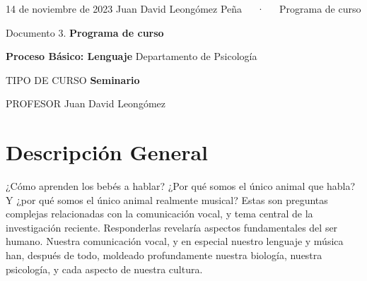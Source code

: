 \documentclass[11pt,a4paper,]{awesome-cv}
\begin{document}
\makecvheader

\makecvfooter
  {14 de noviembre de 2023}
    {Juan David Leongómez Peña~~~·~~~Programa de curso}
  {\thepage}





\vspace{4mm}
\begin{tcolorbox}[enhanced,
        on line, 
        boxsep=4pt, left=0pt,right=0pt,top=0pt,bottom=0pt,
        colframe=white,colback=black]
  
\color{white}
\begin{LARGE}\begin{center}
Documento 3. \textbf{Programa de curso}
\end{center}\end{LARGE}
\end{tcolorbox}

\begin{LARGE}\begin{center}
\textbf{Proceso Básico: Lenguaje}\linebreak
Departamento de Psicología
\end{center}\end{LARGE}

\begin{cvskills}
  \cvskill
    {TIPO DE CURSO}
    {\textbf{Seminario}}
    
  \cvskill
    {PROFESOR}
    {Juan David Leongómez}
\end{cvskills}

\hypertarget{descripciuxf3n-general}{%
\section{Descripción General}\label{descripciuxf3n-general}}

¿Cómo aprenden los bebés a hablar? ¿Por qué somos el único animal que
habla? Y ¿por qué somos el único animal realmente musical? Estas son
preguntas complejas relacionadas con la comunicación vocal, y tema
central de la investigación reciente. Responderlas revelaría aspectos
fundamentales del ser humano. Nuestra comunicación vocal, y en especial
nuestro lenguaje y música han, después de todo, moldeado profundamente
nuestra biología, nuestra psicología, y cada aspecto de nuestra cultura.
\end{document}
